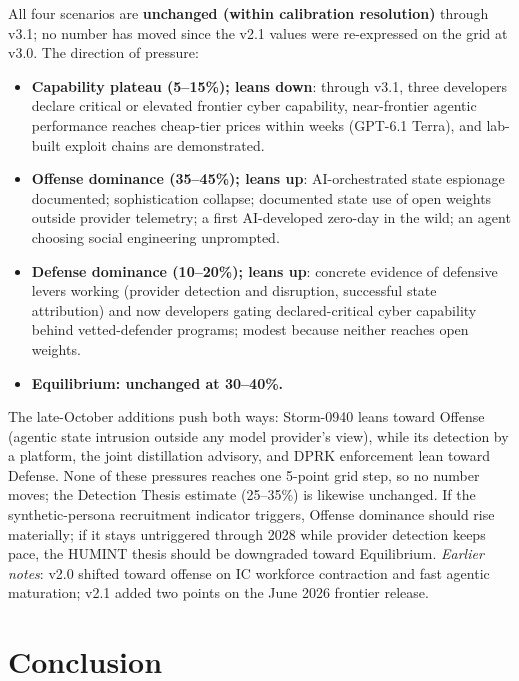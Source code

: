 \documentclass[11pt,letterpaper]{article}
\begin{document}
\begin{infobox}
All four scenarios are \textbf{unchanged (within calibration resolution)} through v3.1; no number has moved since the v2.1 values were re-expressed on the grid at v3.0. The direction of pressure:
\begin{itemize}
  \item \textbf{Capability plateau (5--15\%); leans down}: through v3.1, three developers declare critical or elevated frontier cyber capability, near-frontier agentic performance reaches cheap-tier prices within weeks (GPT-6.1 Terra), and lab-built exploit chains are demonstrated.
  \item \textbf{Offense dominance (35--45\%); leans up}: AI-orchestrated state espionage documented; sophistication collapse; documented state use of open weights outside provider telemetry; a first AI-developed zero-day in the wild; an agent choosing social engineering unprompted.
  \item \textbf{Defense dominance (10--20\%); leans up}: concrete evidence of defensive levers working (provider detection and disruption, successful state attribution) and now developers gating declared-critical cyber capability behind vetted-defender programs; modest because neither reaches open weights.
  \item \textbf{Equilibrium: unchanged at 30--40\%.}
\end{itemize}
The late-October additions push both ways: Storm-0940 leans toward Offense (agentic state intrusion outside any model provider's view), while its detection by a platform, the joint distillation advisory, and DPRK enforcement lean toward Defense. None of these pressures reaches one 5-point grid step, so no number moves; the Detection Thesis estimate (25--35\%) is likewise unchanged.
If the synthetic-persona recruitment indicator triggers, Offense dominance should rise materially; if it stays untriggered through 2028 while provider detection keeps pace, the HUMINT thesis should be downgraded toward Equilibrium. \textit{Earlier notes}: v2.0 shifted toward offense on IC workforce contraction and fast agentic maturation; v2.1 added two points on the June 2026 frontier release.
\end{infobox}

\section{Conclusion}\label{sec:conclusion}
\end{document}
